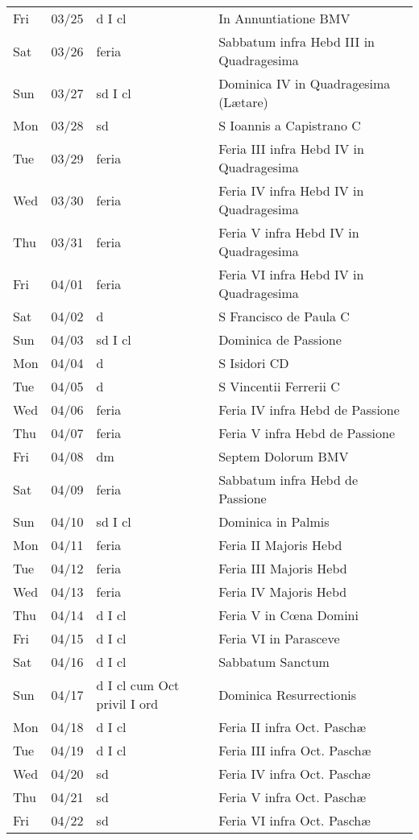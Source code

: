 \documentclass[10pt]{article}
\begin{document}
\begin{longtable}{ l l l l }
Fri & 03/25 & d I cl & In Annuntiatione BMV\\
Sat & 03/26 & feria & Sabbatum infra Hebd III in Quadragesima\\
Sun & 03/27 & sd I cl & Dominica IV in Quadragesima (Lætare)\\
Mon & 03/28 & sd & S Ioannis a Capistrano C\\
Tue & 03/29 & feria & Feria III infra Hebd IV in Quadragesima \\
Wed & 03/30 & feria & Feria IV infra Hebd IV in Quadragesima \\
Thu & 03/31 & feria & Feria V infra Hebd IV in Quadragesima \\
Fri & 04/01 & feria & Feria VI infra Hebd IV in Quadragesima \\
Sat & 04/02 & d & S Francisco de Paula C\\
Sun & 04/03 & sd I cl & Dominica de Passione\\
Mon & 04/04 & d & S Isidori CD\\
Tue & 04/05 & d & S Vincentii Ferrerii C\\
Wed & 04/06 & feria & Feria IV infra Hebd de Passione\\
Thu & 04/07 & feria & Feria V infra Hebd de Passione\\
Fri & 04/08 & dm & Septem Dolorum BMV\\
Sat & 04/09 & feria & Sabbatum infra Hebd de Passione\\
Sun & 04/10 & sd I cl & Dominica in Palmis\\
Mon & 04/11 & feria & Feria II Majoris Hebd\\
Tue & 04/12 & feria & Feria III Majoris Hebd\\
Wed & 04/13 & feria & Feria IV Majoris Hebd\\
Thu & 04/14 & d I cl & Feria V in Cœna Domini\\
Fri & 04/15 & d I cl & Feria VI in Parasceve\\
Sat & 04/16 & d I cl & Sabbatum Sanctum\\
Sun & 04/17 & d I cl cum Oct privil I ord & Dominica Resurrectionis\\
Mon & 04/18 & d I cl & Feria II infra Oct. Paschæ\\
Tue & 04/19 & d I cl & Feria III infra Oct. Paschæ\\
Wed & 04/20 & sd & Feria IV infra Oct. Paschæ\\
Thu & 04/21 & sd & Feria V infra Oct. Paschæ\\
Fri & 04/22 & sd & Feria VI infra Oct. Paschæ\\

\end{longtable}
\end{document}
